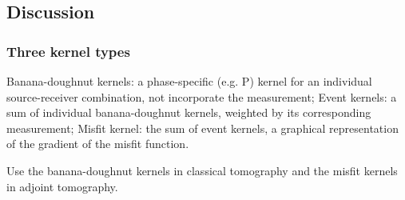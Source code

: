 \subsection{Discussion}
\subsubsection{Three kernel types}
Banana-doughnut kernels: a phase-specific (e.g. P) kernel for an individual source-receiver combination, not incorporate the measurement; Event kernels: a sum of individual banana-doughnut kernels, weighted by its corresponding measurement; Misfit kernel: the sum of event kernels, a graphical representation of the gradient of the misfit function.\par
Use the banana-doughnut kernels in classical tomography and the misfit kernels in adjoint tomography.\par
